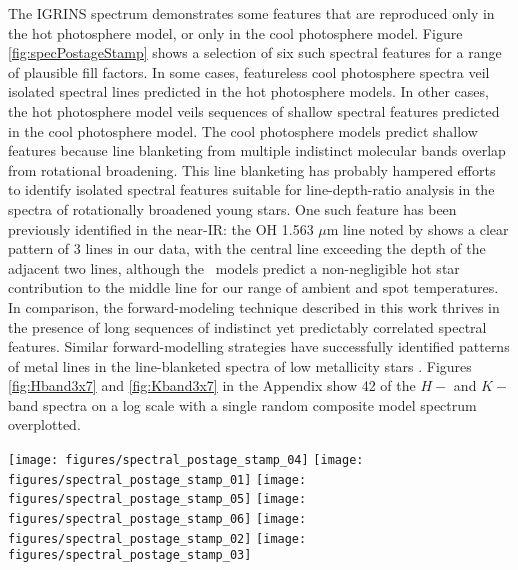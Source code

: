 \documentclass[twocolumn]{emulateapj}%
\begin{document}
The IGRINS spectrum demonstrates some features that are reproduced only in the hot photosphere model, or only in the cool photosphere model.  Figure \ref{fig:specPostageStamp} shows a selection of six such spectral features for a range of plausible fill factors.  In some cases, featureless cool photosphere spectra veil isolated spectral lines predicted in the hot photosphere models.  In other cases, the hot photosphere model veils sequences of shallow spectral features predicted in the cool photosphere model.  The cool photosphere models predict shallow features because line blanketing from multiple indistinct molecular bands overlap from rotational broadening.  This line blanketing has probably hampered efforts to identify isolated spectral features suitable for line-depth-ratio analysis in the spectra of rotationally broadened young stars.  One such feature has been previously identified in the near-IR: the OH 1.563 $\mu$m line noted by \citet{oneal01} shows a clear pattern of 3 lines in our data, with the central line exceeding the depth of the adjacent two lines, although the \PHOENIX\ models predict a non-negligible hot star contribution to the middle line for our range of ambient and spot temperatures.  In comparison, the forward-modeling technique described in this work thrives in the presence of long sequences of indistinct yet predictably correlated spectral features.  Similar forward-modelling strategies have successfully identified patterns of metal lines in the line-blanketed spectra of low metallicity stars \citep{kirby11,kirby15}.  Figures \ref{fig:Hband3x7} and \ref{fig:Kband3x7} in the Appendix show 42 of the $H-$ and $K-$band spectra on a log scale with a single random composite model spectrum overplotted.  

\begin{figure*}
 \centering
 \texttt{[image: figures/spectral\_postage\_stamp\_04]} 
 \texttt{[image: figures/spectral\_postage\_stamp\_01]} 
 \texttt{[image: figures/spectral\_postage\_stamp\_05]} 
 \texttt{[image: figures/spectral\_postage\_stamp\_06]} 
 \texttt{[image: figures/spectral\_postage\_stamp\_02]} 
 \texttt{[image: figures/spectral\_postage\_stamp\_03]} 
 \caption{Examples of spectral features in the observed IGRINS spectrum (thick gray line).  The composite spectrum model (purple thin line) is consistent with the observed spectrum for a range of fill factors, with examples of the the median fill factor (middle panel spectrum) and $\pm2\sigma$ fill factors demarcated on the spectral postage stamps.}
 \label{fig:specPostageStamp}
\end{figure*}
\end{document}
